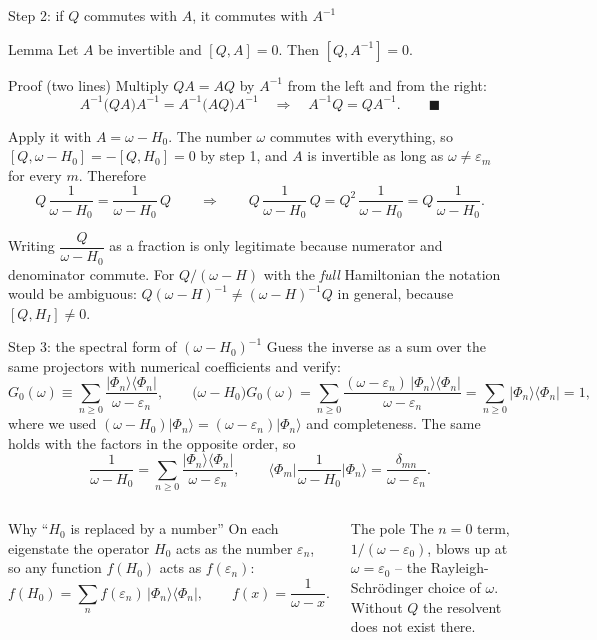 \documentclass[aspectratio=169,10pt]{beamer}
\newcommand{\warnbox}[1]{%
  \begin{tcolorbox}[colback=palewarm,colframe=warm,title={\bfseries A trap to avoid}]
  #1
  \end{tcolorbox}}
\newcommand{\ket}[1]{\vert #1\rangle}
\newcommand{\ketbra}[2]{\vert #1\rangle\langle #2\vert}
\newcommand{\mel}[3]{\langle #1\lvert #2\rvert #3\rangle}
\begin{document}
\begin{frame}[shrink=12]{Step 2: if \(Q\) commutes with \(A\), it commutes with \(A^{-1}\)}
\begin{block}{Lemma}
Let \(A\) be invertible and \([Q,A]=0\). Then \([Q,A^{-1}]=0\).
\end{block}
\begin{block}{Proof (two lines)}
Multiply \(QA=AQ\) by \(A^{-1}\) from the left and from the right:
\[
A^{-1}\bigl(QA\bigr)A^{-1}=A^{-1}\bigl(AQ\bigr)A^{-1}
\quad\Longrightarrow\quad
A^{-1}Q=QA^{-1}.\qquad\blacksquare
\]
\end{block}
Apply it with \(A=\omega-H_0\). The number \(\omega\) commutes with everything, so \([Q,\omega-H_0]=-[Q,H_0]=0\) by step 1, and \(A\) is invertible as long as \(\omega\ne\varepsilon_m\) for every \(m\). Therefore
\[
Q\,\frac{1}{\omega-H_0}=\frac{1}{\omega-H_0}\,Q
\qquad\Longrightarrow\qquad
Q\,\frac{1}{\omega-H_0}\,Q=Q^2\,\frac{1}{\omega-H_0}=Q\,\frac{1}{\omega-H_0}.
\]
\warnbox{Writing \(\dfrac{Q}{\omega-H_0}\) as a fraction is only legitimate because numerator and denominator commute. For \(Q/(\omega-H)\) with the \emph{full} Hamiltonian the notation would be ambiguous: \(Q(\omega-H)^{-1}\ne(\omega-H)^{-1}Q\) in general, because \([Q,H_I]\ne0\).}
\end{frame}

\begin{frame}[shrink=12]{Step 3: the spectral form of \((\omega-H_0)^{-1}\)}
Guess the inverse as a sum over the same projectors with numerical coefficients and verify:
\[
G_0(\omega)\equiv\sum_{n\ge0}\frac{\ketbra{\Phi_n}{\Phi_n}}{\omega-\varepsilon_n},
\qquad
\bigl(\omega-H_0\bigr)G_0(\omega)
=\sum_{n\ge0}\frac{(\omega-\varepsilon_n)\,\ketbra{\Phi_n}{\Phi_n}}{\omega-\varepsilon_n}
=\sum_{n\ge0}\ketbra{\Phi_n}{\Phi_n}=1 ,
\]
where we used \((\omega-H_0)\ket{\Phi_n}=(\omega-\varepsilon_n)\ket{\Phi_n}\) and completeness. The same holds with the factors in the opposite order, so
\[
\boxed{\;\frac{1}{\omega-H_0}=\sum_{n\ge0}\frac{\ketbra{\Phi_n}{\Phi_n}}{\omega-\varepsilon_n},
\qquad
\mel{\Phi_m}{\frac{1}{\omega-H_0}}{\Phi_n}=\frac{\delta_{mn}}{\omega-\varepsilon_n}.\;}
\]
\begin{columns}[T]
\begin{exampleblock}{Why ``\(H_0\) is replaced by a number''}
On each eigenstate the operator \(H_0\) acts as the number \(\varepsilon_n\), so any function \(f(H_0)\) acts as \(f(\varepsilon_n)\):
\[
f(H_0)=\sum_n f(\varepsilon_n)\,\ketbra{\Phi_n}{\Phi_n},\qquad f(x)=\frac{1}{\omega-x}.
\]
\end{exampleblock}
\begin{alertblock}{The pole}
The \(n=0\) term, \(1/(\omega-\varepsilon_0)\), blows up at \(\omega=\varepsilon_0\) -- the Rayleigh-Schr\"odinger choice of \(\omega\). Without \(Q\) the resolvent does not exist there.
\end{alertblock}
\end{columns}
\end{frame}
\end{document}
